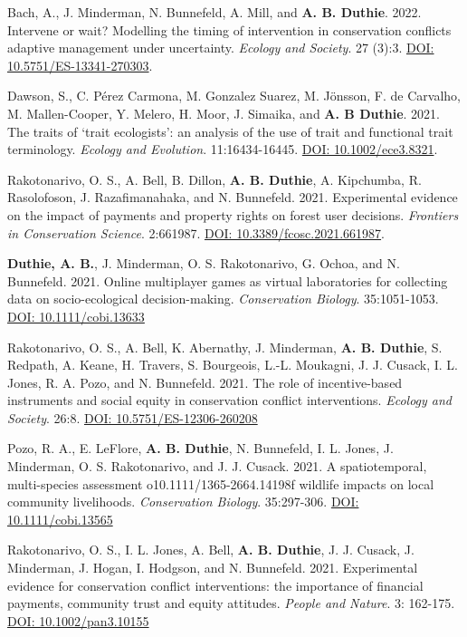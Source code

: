 \documentclass[letterpaper]{article}
\begin{document}
\begin{etaremune}
\item Bach, A., J. Minderman, N. Bunnefeld, A. Mill, and {\bf A. B. Duthie}. 2022. Intervene or wait? Modelling the timing of intervention in conservation conflicts adaptive management under uncertainty. {\it Ecology and Society}. 27 (3):3. \href{https://ecologyandsociety.org/vol27/iss3/art3/}{DOI: 10.5751/ES-13341-270303}.
\item Dawson, S., C. P\'{e}rez Carmona, M. Gonzalez Suarez, M. J\"{o}nsson, F. de Carvalho, M. Mallen-Cooper, Y. Melero, H. Moor, J. Simaika, and {\bf A. B Duthie}. 2021. The traits of `trait ecologists': an analysis of the use of trait and functional trait terminology. {\it Ecology and Evolution}. 11:16434-16445. \href{https://onlinelibrary.wiley.com/doi/10.1002/ece3.8321}{DOI: 10.1002/ece3.8321}.
\item Rakotonarivo, O. S., A. Bell, B. Dillon, {\bf A. B. Duthie}, A. Kipchumba, R. Rasolofoson, J. Razafimanahaka, and N. Bunnefeld. 2021. Experimental evidence on the impact of payments and property rights on forest user decisions. {\it Frontiers in Conservation Science}. 2:661987. \href{https://doi.org/10.3389/fcosc.2021.661987}{DOI: 10.3389/fcosc.2021.661987}.
\item {\bf Duthie, A. B.}, J. Minderman, O. S. Rakotonarivo, G. Ochoa, and N. Bunnefeld. 2021. Online multiplayer games as virtual laboratories for collecting data on socio-ecological decision-making. {\it Conservation Biology}. 35:1051-1053. \href{https://doi.org/10.1111/cobi.13633}{DOI: 10.1111/cobi.13633}
\item Rakotonarivo, O. S., A. Bell, K. Abernathy, J. Minderman, {\bf A. B. Duthie}, S. Redpath, A. Keane, H. Travers, S. Bourgeois, L.-L. Moukagni, J. J. Cusack, I. L. Jones, R. A. Pozo, and N. Bunnefeld. 2021. The role of incentive-based instruments and social equity in conservation conflict interventions. {\it Ecology and Society}. 26:8. \href{https://www.ecologyandsociety.org/vol26/iss2/art8/}{DOI: 10.5751/ES-12306-260208}
\item Pozo, R. A., E. LeFlore, {\bf A. B. Duthie}, N. Bunnefeld, I. L. Jones, J. Minderman, O. S. Rakotonarivo, and J. J. Cusack. 2021. A spatiotemporal, multi-species assessment o10.1111/1365-2664.14198f wildlife impacts on local community livelihoods. {\it Conservation Biology}. 35:297-306. \href{https://doi.org/10.1111/cobi.13565} {DOI: 10.1111/cobi.13565}
\item Rakotonarivo, O. S., I. L. Jones, A. Bell, {\bf A. B. Duthie}, J. J. Cusack, J. Minderman, J. Hogan, I. Hodgson, and N. Bunnefeld. 2021. Experimental evidence for conservation conflict interventions: the importance of financial payments, community trust and equity attitudes. {\it People and Nature}. 3: 162-175. \href{https://doi.org/10.1002/pan3.10155}{DOI: 10.1002/pan3.10155}

\end{etaremune}
\end{document}
